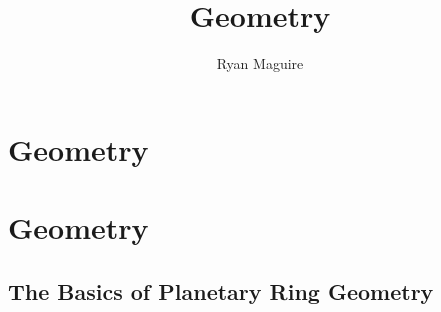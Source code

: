 \documentclass[crop=false,class=book,oneside]{standalone}
\begin{document}
    \ifx\ifplanetdiff\undefined
        \newif\iffunct
        \title{Geometry}
        \author{Ryan Maguire}
        \date{\vspace{-5ex}}
        \maketitle
        \tableofcontents
        \clearpage
        \chapter*{Geometry}
        \setcounter{chapter}{2}
    \else
        \chapter{Geometry}
    \fi
    \section{The Basics of Planetary Ring Geometry}
\end{document}

